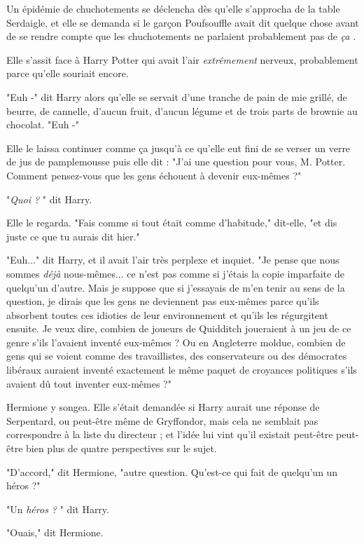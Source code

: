 Un épidémie de chuchotements se déclencha dès qu'elle s'approcha de la table Serdaigle, et elle se demanda si le garçon Poufsouffle avait dit quelque chose avant de se rendre compte que les chuchotements ne parlaient probablement pas de \emph{ça} .

Elle s'assit face à Harry Potter qui avait l'air \emph{extrêmement}  nerveux, probablement parce qu'elle souriait encore.

"Euh -" dit Harry alors qu'elle se servait d'une tranche de pain de mie grillé, de beurre, de cannelle, d'aucun fruit, d'aucun légume et de trois parts de brownie au chocolat. "Euh -"

Elle le laissa continuer comme ça jusqu'à ce qu'elle eut fini de se verser un verre de jus de pamplemousse puis elle dit : "J'ai une question pour vous, M. Potter. Comment pensez-vous que les gens échouent à devenir eux-mêmes ?"

"\emph{Quoi ?} " dit Harry.

Elle le regarda. "Fais comme si tout était comme d'habitude," dit-elle, "et dis juste ce que tu aurais dit hier."

"Euh..." dit Harry, et il avait l'air très perplexe et inquiet. "Je pense que nous sommes \emph{déjà}  nous-mêmes... ce n'est pas comme si j'étais la copie imparfaite de quelqu'un d'autre. Mais je suppose que si j'essayais de m'en tenir au sens de la question, je dirais que les gens ne deviennent pas eux-mêmes parce qu'ils absorbent toutes ces idioties de leur environnement et qu'ils les régurgitent ensuite. Je veux dire, combien de joueurs de Quidditch joueraient à un jeu de ce genre s'ils l'avaient inventé eux-mêmes ? Ou en Angleterre moldue, combien de gens qui se voient comme des travaillistes, des conservateurs ou des démocrates libéraux auraient inventé exactement le même paquet de croyances politiques s'ils avaient dû tout inventer eux-mêmes ?"

Hermione y songea. Elle s'était demandée si Harry aurait une réponse de Serpentard, ou peut-être même de Gryffondor, mais cela ne semblait pas correspondre à la liste du directeur ; et l'idée lui vint qu'il existait peut-être peut-être bien plus de quatre perspectives sur le sujet.

"D'accord," dit Hermione, "autre question. Qu'est-ce qui fait de quelqu'un un héros ?"

"Un \emph{héros ?} " dit Harry.

"Ouais," dit Hermione.

